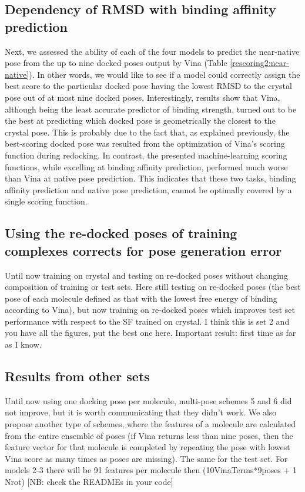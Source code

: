 \documentclass[twocolumn]{bmcart}
\begin{document}
\subsection*{Dependency of RMSD with binding affinity prediction}

Next, we assessed the ability of each of the four models to predict the near-native pose from the up to nine docked poses output by Vina (Table \ref{rescoring2:near-native}). In other words, we would like to see if a model could correctly assign the best score to the particular docked pose having the lowest RMSD to the crystal pose out of at most nine docked poses. Interestingly, results show that Vina, although being the least accurate predictor of binding strength, turned out to be the best at predicting which docked pose is geometrically the closest to the crystal pose. This is probably due to the fact that, as explained previously, the best-scoring docked pose was resulted from the optimization of Vina's scoring function during redocking. In contrast, the presented machine-learning scoring functions, while excelling at binding affinity prediction, performed much worse than Vina at native pose prediction. This indicates that these two tasks, binding affinity prediction and native pose prediction, cannot be optimally covered by a single scoring function.

\subsection*{Using the re-docked poses of training complexes corrects for pose generation error}

Until now training on crystal and testing on re-docked poses without changing composition of training or test sets. Here still testing on re-docked poses (the best pose of each molecule defined as that with the lowest free energy of binding according to Vina), but now training on re-docked poses which improves test set performance with respect to the SF trained on crystal. I think this is set 2 and you have all the figures, put the best one here. Important result: first time as far as I know.

\subsection*{Results from other sets}

Until now using one docking pose per molecule, multi-pose schemes 5 and 6 did not improve, but it is worth communicating that they didn’t work. We also propose another type of schemes, where the features of a molecule are calculated from the entire ensemble of poses (if Vina returns less than nine poses, then the feature vector for that molecule is completed by repeating the pose with lowest Vina score as many times as poses are missing). The same for the test set. For models 2-3 there will be 91 features per molecule then (10VinaTerms*9poses + 1 Nrot) [NB: check the READMEs in your code]
\end{document}
